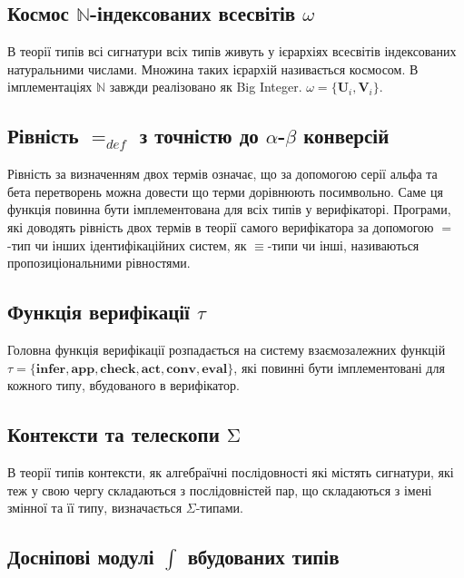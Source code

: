 \documentclass{article}
\theoremstyle{definition}
\begin{document}
\subsection*{Космос $\mathbb{N}$-індексованих всесвітів $\omega$}

В теорії типів всі сигнатури всіх типів живуть у ієрархіях
всесвітів індексованих натуральними числами. Множина таких
ієрархій називається космосом. В імплементаціях $\mathbb{N}$
завжди реалізовано як Big Integer. $\omega = \{ \mathbf{U}_i, \mathbf{V}_i \}$.

\subsection*{Рівність $=_{def}$ з точністю до $\alpha$-$\beta$ конверсій}

Рівність за визначенням двох термів означає, що за допомогою серії альфа та бета
перетворень можна довести що терми дорівнюють посимвольно. Саме ця функція повинна бути
імплементована для всіх типів у верифікаторі. Програми, які доводять рівність двох термів
в теорії самого верифікатора за допомогою $=$-тип чи інших ідентифікаційних систем, як $\equiv$-типи чи інші,
називаються пропозиціональними рівностями.

\subsection*{Функція верифікації $\tau$}

Головна функція верифікації  розпадається на систему взаємозалежних функцій
$\tau = \{ \mathbf{infer},\mathbf{app}, \mathbf{check}, \mathbf{act}, \mathbf{conv}, \mathbf{eval} \}$,
які повинні бути імплементовані для кожного типу, вбудованого в верифікатор.

\subsection*{Контексти та телескопи $\mathrm{\Sigma}$}

В теорії типів контексти, як алгебраїчні послідовності які містять сигнатури, які теж у свою
чергу складаються з послідовністей пар, що складаються з імені змінної та її типу, визначається
$\Sigma$-типами.

\subsection*{Досніпові модулі $\mathrm{\int}$ вбудованих типів}
\end{document}
